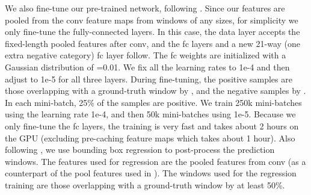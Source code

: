 \documentclass[10pt,journal,cspaper,compsoc]{IEEEtran}
\begin{document}
We also fine-tune our pre-trained network, following \cite{Girshick2014}. Since our features are pooled from the conv feature maps from windows of any sizes, for simplicity we only fine-tune the fully-connected layers. In this case, the data layer accepts the fixed-length pooled features after conv, and the fc layers and a new 21-way (one extra negative category) fc layer follow. The fc weights are initialized with a Gaussian distribution of =0.01. We fix all the learning rates to 1e-4 and then adjust to 1e-5 for all three layers. During fine-tuning, the positive samples are those overlapping with a ground-truth window by , and the negative samples by . In each mini-batch, 25\% of the samples are positive. We train 250k mini-batches using the learning rate 1e-4, and then 50k mini-batches using 1e-5. Because we only fine-tune the fc layers, the training is very fast and takes about 2 hours on the GPU (excluding pre-caching feature maps which takes about 1 hour).
Also following \cite{Girshick2014}, we use bounding box regression to post-process the prediction windows. The features used for regression are the pooled features from conv (as a counterpart of the pool features used in \cite{Girshick2014}). The windows used for the regression training are those overlapping with a ground-truth window by at least 50\%.
\end{document}

